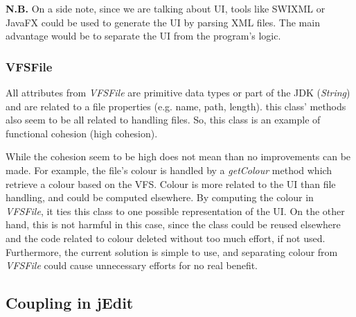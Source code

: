 \begin{framehint2}
    \textbf{N.B.} On a side note, since we are talking about UI, tools like
    SWIXML or JavaFX could be used to generate the UI by parsing XML files.
    The main advantage would be to separate the UI from the program's logic.
\end{framehint2}

\subsubsection{VFSFile}

All attributes from \emph{VFSFile} are primitive data types or part of
the JDK (\emph{String}) and are related to a file properties (e.g. name, path,
length). this class' methods also seem to be all related to handling files.
So, this class is an example of functional cohesion (high cohesion).

\begin{framewarning}
    While the cohesion seem to be high does not mean than no improvements can
    be made.
    For example, the file's colour is handled by a \emph{getColour} method which
    retrieve a colour based on the VFS. Colour is more related to the UI than
    file handling, and could be computed elsewhere.
    By computing the colour in \emph{VFSFile}, it ties this class to one
    possible representation of the UI. On the other hand, this is not harmful in
    this case, since the class could be reused elsewhere and the code related to
    colour deleted without too much effort, if not used. Furthermore, the
    current solution is simple to use, and separating colour from
    \emph{VFSFile} could cause unnecessary efforts for no real benefit.
\end{framewarning}

\subsection{Coupling in jEdit}

\newpage
